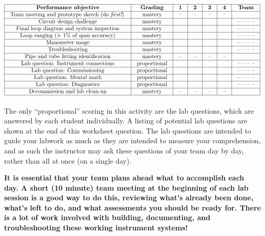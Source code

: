 $$\vbox{\offinterlineskip
\halign{\strut
\vrule \quad\hfil # \ \hfil & 
\vrule \quad\hfil # \ \hfil & 
\vrule \quad\hfil # \ \hfil & 
\vrule \quad\hfil # \ \hfil & 
\vrule \quad\hfil # \ \hfil & 
\vrule \quad\hfil # \ \hfil & 
\vrule \quad\hfil # \ \hfil \vrule \cr
\noalign{\hrule}
%
{\bf Performance objective} & {\bf Grading} & {\bf 1} & {\bf 2} & {\bf 3} & {\bf 4} & {\bf Team} \cr
%
\noalign{\hrule}
%
Team meeting and prototype sketch (do {\it first!}) & mastery & -- & -- & -- & -- & \cr
%
\noalign{\hrule}
%
Circuit design challenge & mastery & & & & & -- -- -- -- \cr
%
\noalign{\hrule}
%
Final loop diagram and system inspection & mastery & & & & & -- -- -- -- \cr
%
\noalign{\hrule}
%
Loop ranging ($\pm$ 1\% of span accuracy) & mastery & & & & & -- -- -- -- \cr
%
\noalign{\hrule}
%
Manometer usage & mastery & & & & & -- -- -- -- \cr
%
\noalign{\hrule}
%
Troubleshooting & mastery & & & & & -- -- -- -- \cr
%
\noalign{\hrule}
%
Pipe and tube fitting identification & mastery & -- & -- & -- & -- & \cr
%
\noalign{\hrule}
%
Lab question: Instrument connections & proportional &  &  &  &  & -- -- -- -- \cr
%
\noalign{\hrule}
%
Lab question: Commissioning & proportional &  &  &  &  & -- -- -- -- \cr
%
\noalign{\hrule}
%
Lab question: Mental math & proportional &  &  &  &  & -- -- -- -- \cr
%
\noalign{\hrule}
%
Lab question: Diagnostics & proportional &  &  &  &  & -- -- -- -- \cr
%
\noalign{\hrule}
%
Decommission and lab clean-up & mastery & -- & -- & -- & -- &  \cr
%
\noalign{\hrule}
} %
}$$ %

The only ``proportional'' scoring in this activity are the lab questions, which are answered by each student individually.  A listing of potential lab questions are shown at the end of this worksheet question.  The lab questions are intended to guide your labwork as much as they are intended to measure your comprehension, and as such the instructor may ask these questions of your team day by day, rather than all at once (on a single day).

\vskip 10pt

{\bf It is essential that your team plans ahead what to accomplish each day.  A short (10 minute) team meeting at the beginning of each lab session is a good way to do this, reviewing what's already been done, what's left to do, and what assessments you should be ready for.  There is a lot of work involved with building, documenting, and troubleshooting these working instrument systems!}

